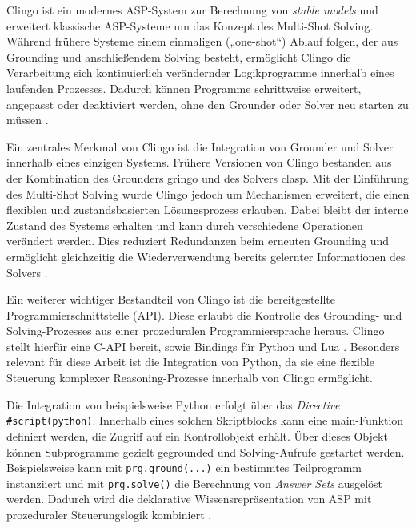 Clingo ist ein modernes ASP-System zur Berechnung von \textit{stable models} und erweitert klassische ASP-Systeme um das Konzept des Multi-Shot Solving. Während frühere Systeme einem einmaligen („one-shot“) Ablauf folgen, der aus Grounding und anschließendem Solving besteht, ermöglicht Clingo die Verarbeitung sich kontinuierlich verändernder Logikprogramme innerhalb eines laufenden Prozesses. Dadurch können Programme schrittweise erweitert, angepasst oder deaktiviert werden, ohne den Grounder oder Solver neu starten zu müssen \parencite{gebserMultishotASPSolving2018}.

Ein zentrales Merkmal von Clingo ist die Integration von Grounder und Solver innerhalb eines einzigen Systems. Frühere Versionen von Clingo bestanden aus der Kombination des Grounders gringo und des Solvers clasp. Mit der Einführung des Multi-Shot Solving wurde Clingo jedoch um Mechanismen erweitert, die einen flexiblen und zustandsbasierten Lösungsprozess erlauben. Dabei bleibt der interne Zustand des Systems erhalten und kann durch verschiedene Operationen verändert werden. Dies reduziert Redundanzen beim erneuten Grounding und ermöglicht gleichzeitig die Wiederverwendung bereits gelernter Informationen des Solvers \parencite{gebserMultishotASPSolving2018}.

Ein weiterer wichtiger Bestandteil von Clingo ist die bereitgestellte Programmierschnittstelle (API). Diese erlaubt die Kontrolle des Grounding- und Solving-Prozesses aus einer prozeduralen Programmiersprache heraus. Clingo stellt hierfür eine C-API bereit, sowie Bindings für Python und Lua \parencite{gebserMultishotASPSolving2018}.  Besonders relevant für diese Arbeit ist die Integration von Python, da sie eine flexible Steuerung komplexer Reasoning-Prozesse innerhalb von Clingo ermöglicht.

Die Integration von beispielsweise Python erfolgt über das \textit{Directive} \texttt{\#script(python)}. Innerhalb eines solchen Skriptblocks kann eine main-Funktion definiert werden, die Zugriff auf ein Kontrollobjekt erhält. Über dieses Objekt können Subprogramme gezielt gegrounded und Solving-Aufrufe gestartet werden. Beispielsweise kann mit \texttt{prg.ground(...)} ein bestimmtes Teilprogramm instanziiert und mit \texttt{prg.solve()} die Berechnung von \textit{Answer Sets} ausgelöst werden. Dadurch wird die deklarative Wissensrepräsentation von ASP mit prozeduraler Steuerungslogik kombiniert \parencite{gebserMultishotASPSolving2018}.


